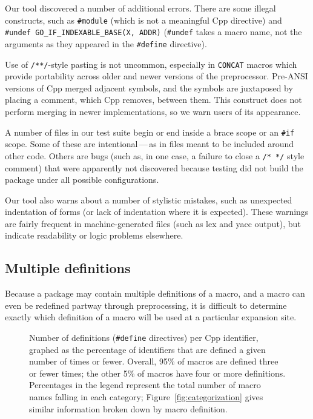 \documentclass[10pt]{article}
\newcommand{\captionsmall}[1]{\caption[]{\small #1}}
\begin{document}
Our tool discovered a number of additional
errors.  There are some illegal constructs, such as {\tt \#module} (which
is not a meaningful Cpp directive) and {\tt \#undef
\verb|GO_IF_INDEXABLE_BASE|(X, ADDR)} ({\tt \#undef} takes a macro name,
not the arguments as they appeared in the {\tt \#define} directive).
  
Use of {\tt /**/}-style pasting is not uncommon, especially in {\tt CONCAT}
macros which provide portability across older and newer versions of the
preprocessor.  Pre-ANSI versions of Cpp merged adjacent symbols, and the
symbols are juxtaposed by placing a comment, which Cpp removes, between
them.  This construct does not perform merging in newer implementations,
so we warn users of its appearance.

A number of files in our test suite begin or end inside a brace scope or an
{\tt \#if} scope.  Some of these are intentional\,---\,as in files meant
to be included around other code.  Others are bugs (such as, in one case, a
failure to close a {\tt /* */} style comment) that were apparently not
discovered because testing did not build the package under all possible
configurations.

Our tool also warns about a number of stylistic mistakes, such as
unexpected indentation of forms (or lack of indentation where it is
expected).  These warnings are fairly frequent in machine-generated files
(such as lex and yacc output), but indicate readability or logic problems
elsewhere.


\subsection{Multiple definitions}
\label{sec:mult-def}

Because a package may contain multiple definitions of a macro, and a macro
can even be redefined partway through preprocessing, it is difficult to
determine exactly which definition of a macro will be used at a particular
expansion site.

\begin{figure}
\centerline{}
\captionsmall{Number of definitions ({\tt \#define} directives) per Cpp
  identifier, graphed as the percentage of identifiers that are defined a
  given number of times or fewer.  Overall, 95\% of macros are defined
  three or fewer times; the other 5\% of macros have four or more
  definitions.  Percentages in the legend represent the total number of
  macro names falling in each category; Figure~\ref{fig:categorization}
  gives similar information broken down by macro definition.}
\label{fig:freq-def-cat}
\end{figure}
\end{document}
